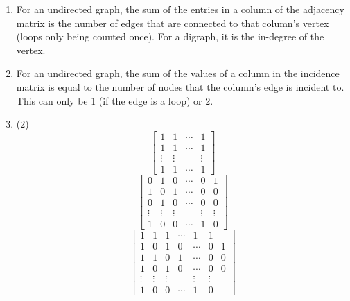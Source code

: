 \documentclass[12pt, A4]{article}
\newcommand{\enumset}[1]{\setcounter{enumi}{#1}}
\begin{document}
\begin{enumerate}
					\[
						\mathbf{M}_{15} = \kbordermatrix{
								\\
								a & 1 & 1  & 1 & 1 & 0 & 0 & 0 & 0 & 0 & 0 \\
								b & 0 & 0 & 0 & 0 & 1 & 1 & 1 & 1 & 0 & 0 \\
								c & 0 & 1 & 1 & 0 & 0 & 1 & 0 & 0 & 1 & 0 \\
								d & 0 & 0 & 0 & 1 & 0 & 0 & 1 & 1 & 0 & 1
							}
					\] 
				\enumset{32}
				\item
					For an undirected graph, the sum of the entries in a column of the adjacency matrix is the number of edges that are connected to that column's vertex (loops only being counted once). For a digraph, it is the in-degree of the vertex.
				\enumset{34}
				\item
					For an undirected graph, the sum of the values of a column in the incidence matrix is equal to the number of nodes that the column's edge is incident to. This can only be 1 (if the edge is a loop) or 2.
				\item
					\begin{tasks}(2)
						\task
							\[\begin{bmatrix}
								1 & 1 & \cdots & 1 \\
								1 & 1 & \cdots & 1 \\
								\vdots & \vdots & & \vdots \\
								1 & 1 & \cdots & 1
							\end{bmatrix}\]
						\task
							\[\begin{bmatrix}
								0 & 1 & 0 & \cdots & 0 & 1 \\
								1 & 0 & 1 & \cdots & 0 & 0 \\
								0 & 1 & 0 & \cdots & 0 & 0 \\
								\vdots & \vdots & \vdots & & \vdots & \vdots \\
								1 & 0 & 0 & \cdots & 1 & 0
							\end{bmatrix}\]
						\task
							\[\begin{bmatrix}
								1 & 1 & 1 & \cdots & 1 & 1 \\
								1 & 0 & 1 & 0 & \cdots & 0 & 1 \\
								1 & 1 & 0 & 1 & \cdots & 0 & 0 \\
								1 & 0 & 1 & 0 & \cdots & 0 & 0 \\
								\vdots & \vdots & \vdots & & \vdots & \vdots \\
								1 & 0 & 0 & \cdots & 1 & 0
							\end{bmatrix}\]

\end{tasks}
\end{enumerate}
\end{document}

